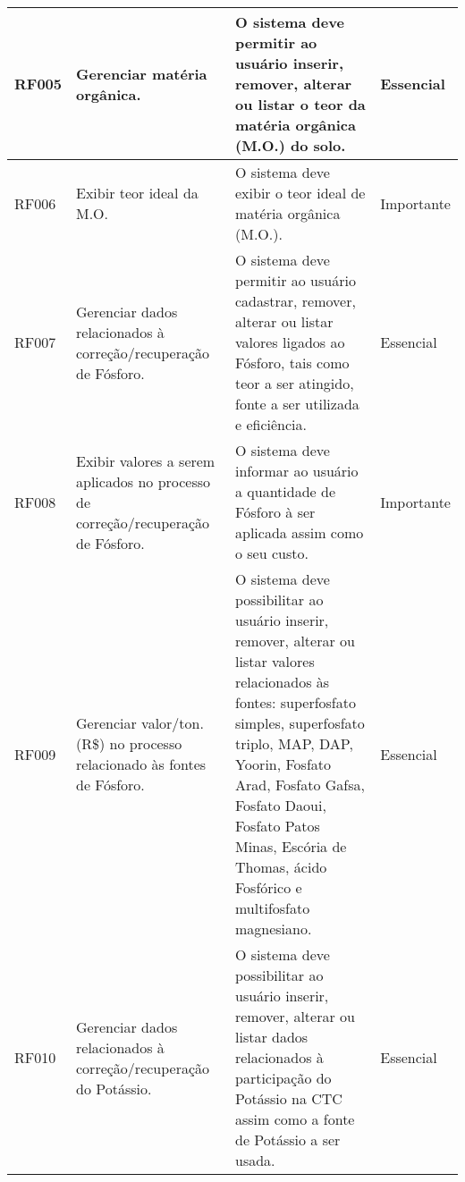 \begin{landscape}
\begin{longtable}{|p{1.5cm}|p{5cm}|p{9cm}|p{2.5cm}|}
    RF005 & Gerenciar matéria orgânica.                                                      & O sistema deve permitir ao usuário inserir, remover, alterar ou listar o teor da matéria orgânica (M.O.) do solo.                                                                                                                                                                                       & Essencial  \\\hline
    RF006 & Exibir teor ideal da M.O.                                                        & O sistema deve exibir o teor ideal de matéria orgânica (M.O.).                                                                                                                                                                                                                                          & Importante \\\hline
    RF007 & Gerenciar dados relacionados à correção/recuperação  de Fósforo.                 & O sistema deve permitir ao usuário cadastrar, remover,  alterar ou listar valores ligados ao Fósforo, tais como teor a ser atingido, fonte a ser utilizada e eficiência.                                                                                                                                & Essencial  \\\hline
    RF008 & Exibir valores a serem aplicados no processo de correção/recuperação de Fósforo. & O sistema deve informar ao usuário a quantidade de Fósforo à ser aplicada assim como o seu custo.                                                                                                                                                                                                       & Importante \\\hline
    RF009 & Gerenciar valor/ton. (R\$) no processo relacionado às fontes de Fósforo.         & O sistema deve possibilitar ao usuário inserir, remover, alterar ou listar valores relacionados às fontes: superfosfato simples, superfosfato triplo, MAP, DAP, Yoorin, Fosfato Arad, Fosfato Gafsa, Fosfato Daoui, Fosfato  Patos Minas, Escória de Thomas, ácido Fosfórico e multifosfato magnesiano. & Essencial  \\\hline
    RF010 & Gerenciar dados relacionados à correção/recuperação do Potássio.                 & O sistema deve possibilitar ao usuário inserir, remover,  alterar ou listar dados relacionados à participação do Potássio na CTC assim como a fonte de Potássio a ser usada.                                                                                                                            & Essencial  \\\hline

\end{longtable}
\end{landscape}
